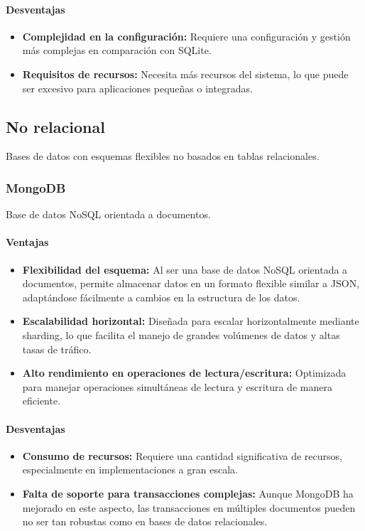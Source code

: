 \paragraph{Desventajas}
\begin{itemize}
    \item \textbf{Complejidad en la configuración:} Requiere una configuración y gestión más complejas en comparación con SQLite.
    
    \item \textbf{Requisitos de recursos:} Necesita más recursos del sistema, lo que puede ser excesivo para aplicaciones pequeñas o integradas.
\end{itemize}

\subsection{No relacional}
Bases de datos con esquemas flexibles no basados en tablas relacionales.

\subsubsection{MongoDB}
Base de datos NoSQL orientada a documentos.

\paragraph{Ventajas}
\begin{itemize}
    \item \textbf{Flexibilidad del esquema:} Al ser una base de datos NoSQL orientada a documentos, permite almacenar datos en un formato flexible similar a JSON, adaptándose fácilmente a cambios en la estructura de los datos.
    
    \item \textbf{Escalabilidad horizontal:} Diseñada para escalar horizontalmente mediante sharding, lo que facilita el manejo de grandes volúmenes de datos y altas tasas de tráfico.
    
    \item \textbf{Alto rendimiento en operaciones de lectura/escritura:} Optimizada para manejar operaciones simultáneas de lectura y escritura de manera eficiente.
\end{itemize}

\paragraph{Desventajas}
\begin{itemize}
    \item \textbf{Consumo de recursos:} Requiere una cantidad significativa de recursos, especialmente en implementaciones a gran escala.
    
    \item \textbf{Falta de soporte para transacciones complejas:} Aunque MongoDB ha mejorado en este aspecto, las transacciones en múltiples documentos pueden no ser tan robustas como en bases de datos relacionales.
\end{itemize}


